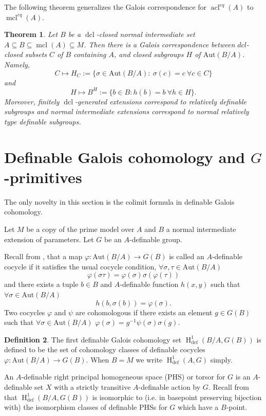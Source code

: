 \documentclass{amsart}
\newtheorem{theorem}{Theorem}[section]
\theoremstyle{definition}
\newtheorem{definition}[theorem]{Definition}
\theoremstyle{remark}
\numberwithin{equation}{section}
\def \defin {\operatorname{def}}
\def \HH {\operatorname{H}}
\def \aut {\text{Aut}}
\def \mcl {\operatorname{mcl}}
\def \acl {\operatorname{acl}}
\def \dcl {\operatorname{dcl}}
\begin{document}
The following theorem generalizes the Galois correspondence for $\acl^{eq}(A)$ to $\mcl^{eq}(A)$.

\begin{theorem}\cite{meretzky2026galoistheoryautomorphismgroups}
    Let $B$ be a $\dcl$-closed normal intermediate set $A \subseteq B \subseteq \mcl(A) \subseteq M$. Then there is a Galois correspondence between $dcl$-closed subsets $C$ of $B$ containing $A$, and closed subgroups $H$ of $\aut(B/A)$. Namely, $$C \mapsto H_C:= \{\sigma\in \aut(B/A) : \ \sigma(c) = c \ \forall c \in C\}$$ and $$H \mapsto B^H:= \{b \in B : h(b)= b \  \forall h \in H\}.$$ Moreover, finitely $\dcl$-generated extensions correspond to relatively definable subgroups and normal intermediate extensions correspond to normal relatively type definable subgroups.  
\end{theorem}

\section{Definable Galois cohomology and $G$-primitives}\label{sec: Gal coho}

The only novelty in this section is the colimit formula in definable Galois cohomology.

Let $M$ be a copy of the prime model over $A$ and $B$ a normal intermediate extension of parameters. Let $G$ be an $A$-definable group.  

Recall from \cite{pillay1997}, \cite{MERETZKY_SES} that a map $\varphi:\aut(B/A) \to G(B)$ is called an $A$-definable cocycle if it satisfies the usual cocycle condition, $\forall \sigma,\tau \in \aut(B/A)$ $$\varphi(\sigma\tau) =\varphi(\sigma)\sigma(\varphi(\tau))$$ and there exists a tuple $b \in B$ and $A$-definable function $h(x,y)$ such that $\forall\sigma \in \aut(B/A)$ $$h(b,\sigma(b)) = \varphi(\sigma).$$ Two cocycles $\varphi$ and $\psi$ are cohomologous if there exists an element $g \in G(B)$ such that $\forall \sigma \in \aut(B/A)$ $\varphi(\sigma) = g^{-1}\psi(\sigma)\sigma(g)$. 

\begin{definition}\cite{MERETZKY_SES}
    The first definable Galois cohomology set $\HH^1_{\defin}(B/A,G(B))$ is defined to be the set of cohomology classes of definable cocycles $\varphi:\aut(B/A) \to G(B)$.  When $B=M$ we write $\HH^1_{\defin}(A,G)$ simply.
\end{definition}

An $A$-definable right principal homogeneous space (PHS) or torsor for $G$ is an $A$-definable set $X$ with a strictly transitive $A$-definable action by $G$. Recall from \cite{MERETZKY_SES} that $\HH^1_{\defin}(B/A,G(B))$ is isomorphic to (i.e. in basepoint preserving bijection with) the isomorphism classes of definable PHSs for $G$ which have a $B$-point.
\end{document}

